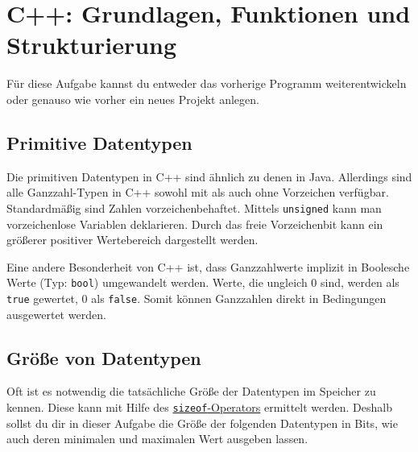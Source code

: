 
\section{\ExercisePrefixBasics C++: Grundlagen, Funktionen und Strukturierung}
\label{sec:basics}
Für diese Aufgabe kannst du entweder das vorherige Programm weiterentwickeln oder genauso wie vorher ein neues Projekt anlegen.

\subsection*{Primitive Datentypen} 
Die primitiven Datentypen in C++ sind ähnlich zu denen in Java.
Allerdings sind alle Ganzzahl-Typen in C++ sowohl mit als auch ohne Vorzeichen verfügbar.
Standardmäßig sind Zahlen vorzeichenbehaftet.
Mittels \lstinline{unsigned} kann man vorzeichenlose Variablen deklarieren.
Durch das freie Vorzeichenbit kann ein größerer positiver Wertebereich dargestellt werden.


Eine andere Besonderheit von C++ ist, dass Ganzzahlwerte implizit in Boolesche Werte (Typ: \lstinline{bool}) umgewandelt werden.
Werte, die ungleich 0 sind, werden als \lstinline{true} gewertet, 0 als \lstinline{false}.
Somit können Ganzzahlen direkt in Bedingungen ausgewertet werden.

\subsection{Größe von Datentypen}
Oft ist es notwendig die tatsächliche Größe der Datentypen im Speicher zu kennen. Diese kann mit Hilfe des \href{http://en.cppreference.com/w/c/language/sizeof}{\lstinline{sizeof}-Operators} ermittelt werden.
Deshalb sollst du dir in dieser Aufgabe die Größe der folgenden Datentypen in Bits, wie auch deren minimalen und maximalen Wert ausgeben lassen.



